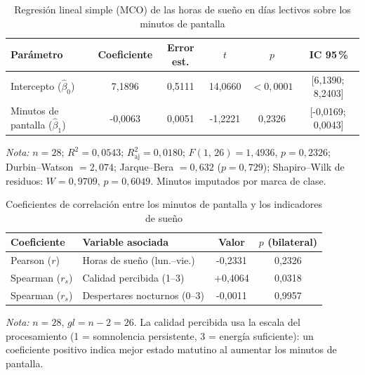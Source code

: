 \begin{table}[H]
\centering
\caption{Regresión lineal simple (MCO) de las horas de sueño en días lectivos sobre los minutos de pantalla}
\label{tab:c7}
\footnotesize
\begin{tabular}{lccccc}
\toprule
\textbf{Parámetro} & \textbf{Coeficiente} & \textbf{Error est.} & \textbf{$t$} & \textbf{$p$} & \textbf{IC 95\,\%} \\
\midrule
Intercepto ($\hat\beta_0$) & 7,1896 & 0,5111 & 14,0660 & $<0{,}0001$ & [6,1390;\,8,2403] \\
Minutos de pantalla ($\hat\beta_1$) & -0,0063 & 0,0051 & -1,2221 & 0,2326 & [-0,0169;\,0,0043] \\
\bottomrule
\end{tabular}
\par\smallskip\parbox{0.92\linewidth}{\footnotesize\textit{Nota:} $n = 28$; $R^2 = 0,0543$; $R^2_{\text{aj}} = 0,0180$; $F(1,\,26) = 1,4936$, $p = 0,2326$; Durbin--Watson $= 2,074$; Jarque--Bera $= 0,632$ ($p = 0,729$); Shapiro--Wilk de residuos: $W = 0,9709$, $p = 0,6049$. Minutos imputados por marca de clase.}
\fuente
\end{table}

\begin{table}[H]
\centering
\caption{Coeficientes de correlación entre los minutos de pantalla y los indicadores de sueño}
\label{tab:c8}
\small
\begin{tabular}{llcc}
\toprule
\textbf{Coeficiente} & \textbf{Variable asociada} & \textbf{Valor} & \textbf{$p$ (bilateral)} \\
\midrule
Pearson ($r$) & Horas de sueño (lun.--vie.) & -0,2331 & 0,2326 \\
Spearman ($r_s$) & Calidad percibida (1--3) & +0,4064 & 0,0318 \\
Spearman ($r_s$) & Despertares nocturnos (0--3) & -0,0011 & 0,9957 \\
\bottomrule
\end{tabular}
\par\smallskip\parbox{0.92\linewidth}{\footnotesize\textit{Nota:} $n = 28$, $gl = n - 2 = 26$. La calidad percibida usa la escala del procesamiento (1 = somnolencia persistente, 3 = energía suficiente): un coeficiente positivo indica mejor estado matutino al aumentar los minutos de pantalla.}
\fuente
\end{table}

